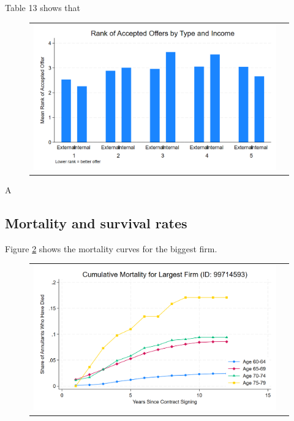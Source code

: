 \documentclass[12pt]{article}
\begin{document}



 


Table 13 shows that 





  \begin{figure}[H]
\caption{}
 \label{fig:ie4_11}
\centering{}%
\begin{tabular}{cc}
\includegraphics[scale=0.17]{figures/IE4/IE4_rank_by_type_income.png} 
\end{tabular}
\end{figure} 

\newpage
A
\newpage
\subsection{Mortality and survival rates}

Figure \ref{fig:ie4_12} shows the mortality curves for the biggest firm. 

\begin{figure}[H]
\caption{}
\label{fig:ie4_12}
\centering{}%
\begin{tabular}{cc}
\includegraphics[scale=0.2]{figures/IE4/IE4_mortality_curves_by_age.png} 
\end{tabular}
\end{figure} 
\end{document}
